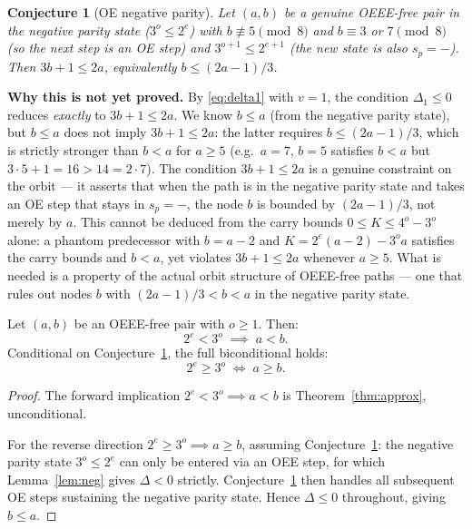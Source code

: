 \documentclass[11pt]{article}
\newtheorem{conjecture}{Conjecture}
\begin{document}
\begin{conjecture}[OE negative parity]
\label{conj:oe}
Let $(a, b)$ be a genuine OEEE-free pair in the negative parity state
($3^o \leq 2^e$) with $b \not\equiv 5\pmod{8}$ and $b \equiv 3$ or
$7\pmod{8}$ (so the next step is an OE step) and $3^{o+1} \leq 2^{e+1}$
(the new state is also $s_p = -$).  Then $3b + 1 \leq 2a$,
equivalently $b \leq (2a-1)/3$.
\end{conjecture}

\noindent\textbf{Why this is not yet proved.}
By \eqref{eq:delta1} with $v = 1$, the condition $\Delta_1 \leq 0$
reduces \emph{exactly} to $3b + 1 \leq 2a$.  We know $b \leq a$ (from
the negative parity state), but $b \leq a$ does not imply $3b+1 \leq 2a$:
the latter requires $b \leq (2a-1)/3$, which is strictly stronger than
$b < a$ for $a \geq 5$ (e.g.\ $a = 7$, $b = 5$ satisfies $b < a$ but
$3 \cdot 5 + 1 = 16 > 14 = 2 \cdot 7$).  The condition $3b+1 \leq 2a$
is a genuine constraint on the orbit — it asserts that when the path is
in the negative parity state and takes an OE step that stays in $s_p=-$,
the node $b$ is bounded by $(2a-1)/3$, not merely by $a$.  This cannot
be deduced from the carry bounds $0 \leq K \leq 4^o - 3^o$ alone:
a phantom predecessor with $b = a - 2$ and $K = 2^e(a-2) - 3^o a$
satisfies the carry bounds and $b < a$, yet violates $3b+1 \leq 2a$
whenever $a \geq 5$.  What is needed is a property of the actual orbit
structure of OEEE-free paths — one that rules out nodes $b$ with
$(2a-1)/3 < b < a$ in the negative parity state.

\begin{theorem}
\label{thm:ordering}
Let $(a, b)$ be an OEEE-free pair with $o \geq 1$.  Then:
\[
  2^e < 3^o \;\implies\; a < b.
\]
Conditional on Conjecture~\ref{conj:oe}, the full biconditional holds:
\[
  2^e \geq 3^o \;\iff\; a \geq b.
\]
\end{theorem}

\begin{proof}
The forward implication $2^e < 3^o \implies a < b$ is
Theorem~\ref{thm:approx}, unconditional.

For the reverse direction $2^e \geq 3^o \implies a \geq b$, assuming
Conjecture~\ref{conj:oe}: the negative parity state $3^o \leq 2^e$ can
only be entered via an OEE step, for which Lemma~\ref{lem:neg} gives
$\Delta < 0$ strictly.  Conjecture~\ref{conj:oe} then handles all
subsequent OE steps sustaining the negative parity state.  Hence
$\Delta \leq 0$ throughout, giving $b \leq a$.
\end{proof}
\end{document}
